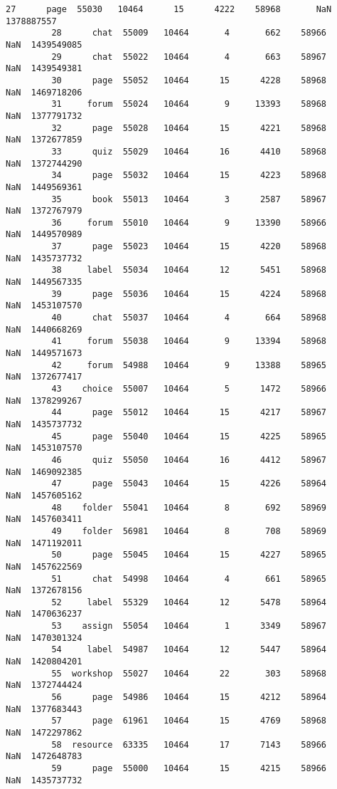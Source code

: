 \documentclass[11pt]{article}
\begin{document}
\begin{Verbatim}[commandchars=\\\{\}]
         27      page  55030   10464      15      4222    58968       NaN  1378887557   
         28      chat  55009   10464       4       662    58966       NaN  1439549085   
         29      chat  55022   10464       4       663    58967       NaN  1439549381   
         30      page  55052   10464      15      4228    58968       NaN  1469718206   
         31     forum  55024   10464       9     13393    58968       NaN  1377791732   
         32      page  55028   10464      15      4221    58968       NaN  1372677859   
         33      quiz  55029   10464      16      4410    58968       NaN  1372744290   
         34      page  55032   10464      15      4223    58968       NaN  1449569361   
         35      book  55013   10464       3      2587    58967       NaN  1372767979   
         36     forum  55010   10464       9     13390    58966       NaN  1449570989   
         37      page  55023   10464      15      4220    58968       NaN  1435737732   
         38     label  55034   10464      12      5451    58968       NaN  1449567335   
         39      page  55036   10464      15      4224    58968       NaN  1453107570   
         40      chat  55037   10464       4       664    58968       NaN  1440668269   
         41     forum  55038   10464       9     13394    58968       NaN  1449571673   
         42     forum  54988   10464       9     13388    58965       NaN  1372677417   
         43    choice  55007   10464       5      1472    58966       NaN  1378299267   
         44      page  55012   10464      15      4217    58967       NaN  1435737732   
         45      page  55040   10464      15      4225    58965       NaN  1453107570   
         46      quiz  55050   10464      16      4412    58967       NaN  1469092385   
         47      page  55043   10464      15      4226    58964       NaN  1457605162   
         48    folder  55041   10464       8       692    58969       NaN  1457603411   
         49    folder  56981   10464       8       708    58969       NaN  1471192011   
         50      page  55045   10464      15      4227    58965       NaN  1457622569   
         51      chat  54998   10464       4       661    58965       NaN  1372678156   
         52     label  55329   10464      12      5478    58964       NaN  1470636237   
         53    assign  55054   10464       1      3349    58967       NaN  1470301324   
         54     label  54987   10464      12      5447    58964       NaN  1420804201   
         55  workshop  55027   10464      22       303    58968       NaN  1372744424   
         56      page  54986   10464      15      4212    58964       NaN  1377683443   
         57      page  61961   10464      15      4769    58968       NaN  1472297862   
         58  resource  63335   10464      17      7143    58966       NaN  1472648783   
         59      page  55000   10464      15      4215    58966       NaN  1435737732   
         

\end{Verbatim}
\end{document}
